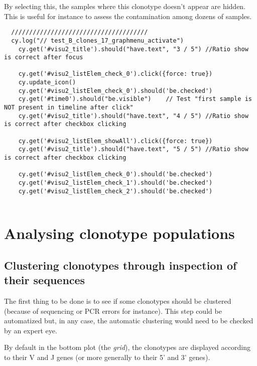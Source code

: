 By selecting this, the samples where this clonotype doesn't appear are hidden.
This is useful for instance to assess the contamination among dozens of
samples.

\begin{verbatim}
  //////////////////////////////////////
  cy.log("// test_B_clones_17_graphmenu_activate")
    cy.get('#visu2_title').should("have.text", "3 / 5") //Ratio show is correct after focus

    cy.get('#visu2_listElem_check_0').click({force: true})
    cy.update_icon()
    cy.get('#visu2_listElem_check_0').should('be.checked')
    cy.get('#time0').should("be.visible")    // Test "first sample is NOT present in timeline after click"
    cy.get('#visu2_title').should("have.text", "4 / 5") //Ratio show is correct after checkbox clicking

    cy.get('#visu2_listElem_showAll').click({force: true})
    cy.get('#visu2_title').should("have.text", "5 / 5") //Ratio show is correct after checkbox clicking

    cy.get('#visu2_listElem_check_0').should('be.checked')
    cy.get('#visu2_listElem_check_1').should('be.checked')
    cy.get('#visu2_listElem_check_2').should('be.checked')


\end{verbatim}

\section{Analysing clonotype populations}

\subsection{Clustering clonotypes through inspection of their sequences}

The first thing to be done is to see if some clonotypes should be clustered (because
of sequencing or PCR errors for instance). This step could be automatized
but, in any case, the automatic clustering would need to be checked by an expert
eye.

By default in the bottom plot (the \textit{grid}), the clonotypes
  are displayed according to their V and J genes (or more generally to their
  5' and 3' genes). 

